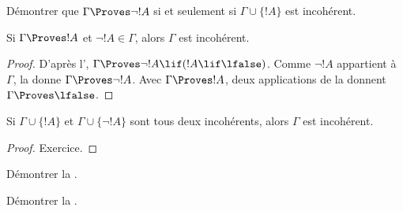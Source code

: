 \documentclass[../../../include/open-logic-section]{subfiles}
\begin{document}
\begin{prob}
Démontrer que $\Gamma \Proves \lnot !A$ si et seulement si
$\Gamma \cup \{!A\}$ est incohérent.
\end{prob}

\begin{prop}
Si $\Gamma \Proves !A$ et $\lnot !A \in \Gamma$, alors $\Gamma$ est
incohérent.
\end{prop}

\begin{proof}
D'après l',
$\Gamma \Proves \lnot !A \lif (!A \lif \lfalse)$. Comme $\lnot !A$
appartient à~$\Gamma$, la  donne
$\Gamma \Proves \lnot !A$. Avec $\Gamma \Proves !A$, deux applications
de la  donnent $\Gamma \Proves \lfalse$.
\end{proof}

\begin{prop}
Si $\Gamma \cup \{!A\}$ et $\Gamma \cup \{\lnot !A\}$ sont tous deux
incohérents, alors $\Gamma$ est incohérent.
\end{prop}

\begin{proof}
Exercice.
\end{proof}

\begin{prob}
Démontrer la .
\end{prob}
\tagendprob

\begin{prob}
Démontrer la .
\end{prob}
\tagendprob
\end{document}
